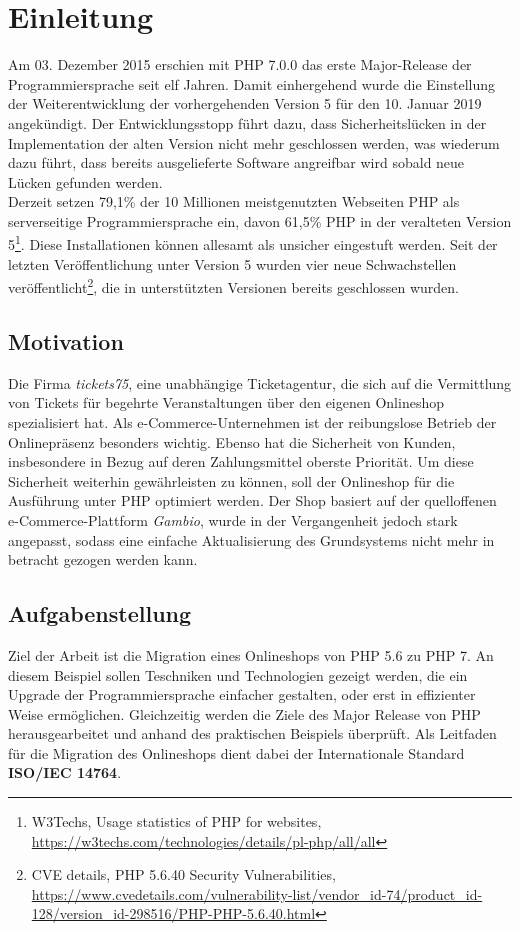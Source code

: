 \chapter{Einleitung}
Am 03. Dezember 2015 erschien mit PHP 7.0.0 das erste Major-Release der Programmiersprache seit elf Jahren. Damit einhergehend wurde die Einstellung der Weiterentwicklung der vorhergehenden Version
5 für den 10. Januar 2019 angekündigt. Der Entwicklungsstopp führt dazu, dass Sicherheitslücken in der Implementation der alten Version nicht mehr geschlossen werden, was 
wiederum dazu führt, dass bereits ausgelieferte Software angreifbar wird sobald neue Lücken gefunden werden. \\
Derzeit setzen 79,1\% der 10 Millionen meistgenutzten Webseiten PHP als serverseitige Programmiersprache ein, davon 61,5\% PHP in der veralteten Version 5\footnote{W3Techs, \glqq Usage statistics of PHP for websites\grqq , 
\url{https://w3techs.com/technologies/details/pl-php/all/all}}. Diese Installationen können allesamt als unsicher eingestuft werden. Seit der letzten Veröffentlichung 
unter Version 5 wurden vier neue Schwachstellen veröffentlicht\footnote{CVE details, \glqq PHP 5.6.40 Security Vulnerabilities\grqq , 
\url{https://www.cvedetails.com/vulnerability-list/vendor_id-74/product_id-128/version_id-298516/PHP-PHP-5.6.40.html}}, die in unterstützten Versionen bereits geschlossen 
wurden.

\section{Motivation}
Die Firma \textit{tickets75}, eine unabhängige Ticketagentur, die sich auf die Vermittlung von Tickets für begehrte 
Veranstaltungen über den eigenen Onlineshop spezialisiert hat. Als e-Commerce-Unternehmen ist der reibungslose Betrieb der 
Onlinepräsenz besonders wichtig. Ebenso hat die Sicherheit von Kunden, insbesondere in Bezug auf deren Zahlungsmittel oberste 
Priorität. Um diese Sicherheit weiterhin gewährleisten zu können, soll der Onlineshop für die Ausführung unter \ac{PHP} optimiert 
werden. Der Shop basiert auf der quelloffenen e-Commerce-Plattform \textit{Gambio}, wurde in der Vergangenheit jedoch stark 
angepasst, sodass eine einfache Aktualisierung des Grundsystems nicht mehr in betracht gezogen werden kann.

\section{Aufgabenstellung}
Ziel der Arbeit ist die Migration eines Onlineshops von PHP 5.6 zu PHP 7. An diesem Beispiel sollen Teschniken und Technologien 
gezeigt werden, die ein Upgrade der Programmiersprache einfacher gestalten, oder erst in effizienter Weise ermöglichen. 
Gleichzeitig werden die Ziele des Major Release von PHP herausgearbeitet und anhand des praktischen Beispiels überprüft.
Als Leitfaden für die Migration des Onlineshops dient dabei der Internationale Standard \textbf{ISO/IEC 14764}.

